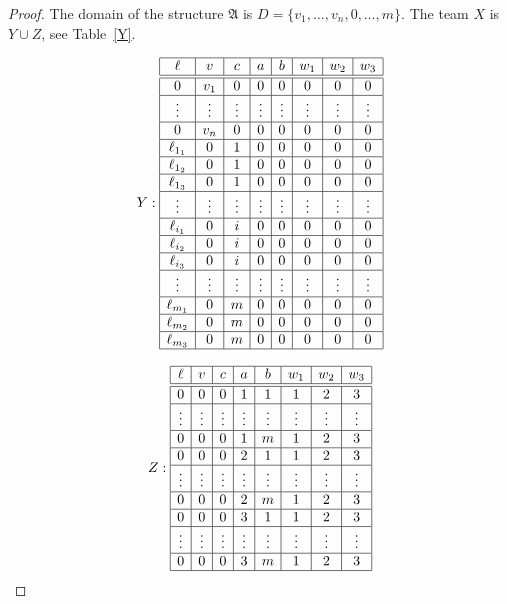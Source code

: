 \documentclass{article}
\theoremstyle{plain}
\theoremstyle{definition}
\newcommand{\mA}{{\mathfrak A}}
\def\one{w_1}
\def\two{w_2}
\def\three{w_3}
\begin{document}
\begin{proof}
The domain of the structure $\mA$ is $D = \{v_1, \hdots, v_n, 0,\hdots, m\}$. The team $X$ is $Y \cup Z$, see Table~\ref{Y}.
\begin{table}
	\[\begin{array}{c}
	Y:
	\begin{array}{|c|c|c|c|c|c|c|c|c|}
    			\hline  
		\ell & v & c & a & b & \one & \two & \three \\ 
			\hline
			\hline
  		0 & v_1  & 0 & 0 & 0 & 0 & 0 & 0\\ 
			\hline
 		\vdots & \vdots & \vdots & \vdots & \vdots & \vdots & \vdots & \vdots \\ 
			\hline
		0 & v_n  &  0 & 0 & 0 & 0 & 0 & 0\\
			\hline
		\ell_{1_1} &  0 & 1 & 0 & 0 & 0 & 0 & 0\\
			\hline
  		\ell_{1_2} &  0 & 1 & 0 & 0 & 0 & 0 & 0\\
			\hline
  		\ell_{1_3} &  0 & 1 & 0 & 0 & 0 & 0 & 0\\
			\hline
		\vdots &  \vdots & \vdots & \vdots & \vdots & \vdots & \vdots & \vdots \\ 
			\hline
  		\ell_{i_1}  & 0 & i & 0 & 0 & 0 & 0 & 0\\
			\hline
  		\ell_{i_2}  & 0 & i & 0 & 0 & 0 & 0 & 0\\
			\hline
  		\ell_{i_3}  & 0& i & 0 & 0 & 0 & 0 & 0\\
			\hline
		\vdots  & \vdots & \vdots & \vdots & \vdots & \vdots & \vdots & \vdots \\ 
			\hline
  		\ell_{m_1}  & 0 & m & 0 & 0 & 0 & 0 & 0\\
			\hline
  		\ell_{m_2}  & 0 & m & 0 & 0 & 0 & 0 & 0\\
			\hline
  		\ell_{m_3}  & 0 & m & 0 & 0 & 0 & 0 & 0\\
			\hline
  	\end{array} 
  	\\
	\\
	Z:
	\begin{array}{|c|c|c|c|c|c|c|c|c|}
			\hline
		\ell & v & c & a & b & \one &\two&\three\\ 
			\hline
			\hline
    		0 & 0 &  0 & 1 & 1 & 1 & 2 & 3\\
			\hline
		\vdots &  \vdots & \vdots & \vdots & \vdots& \vdots & \vdots & \vdots \\ 
			\hline
		0 & 0 &  0 & 1 & m & 1 & 2 & 3\\
			\hline
		0 & 0  & 0 & 2 & 1 & 1 & 2 & 3\\
			\hline
		 \vdots & \vdots & \vdots & \vdots & \vdots &  \vdots & \vdots & \vdots \\ 
			\hline
		0 &  0 & 0 & 2 & m & 1 & 2 & 3\\
			\hline
		0 &  0 & 0 & 3 & 1 & 1 & 2 & 3\\
			\hline
		\vdots  & \vdots & \vdots & \vdots & \vdots &  \vdots & \vdots & \vdots\\ 
			\hline
		0 & 0 & 0 & 3 & m & 1 & 2 & 3\\
			\hline
  	\end{array} 


\end{array}\]
\end{table}
\end{proof}
\end{document}
